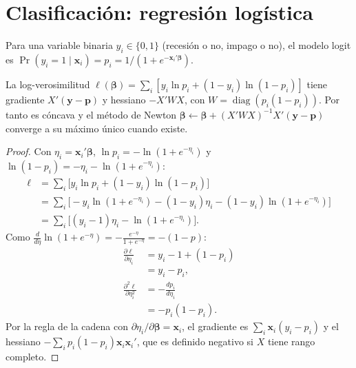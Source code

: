 \section{Clasificación: regresión logística}

Para una variable binaria $y_i\in\{0,1\}$ (recesión o no, impago o no), el modelo logit es
$\Pr(y_i=1\mid\mathbf x_i)=p_i=1/(1+e^{-\mathbf x_i'\boldsymbol\beta})$.

\begin{proposicion}\label{prop:logit}
La log-verosimilitud $\ell(\boldsymbol\beta)=\sum_i[y_i\ln p_i+(1-y_i)\ln(1-p_i)]$ tiene gradiente $X'(\mathbf y-\mathbf p)$ y hessiano
$-X'WX$, con $W=\operatorname{diag}(p_i(1-p_i))$. Por tanto es cóncava y el método de Newton
$\boldsymbol\beta\leftarrow\boldsymbol\beta+(X'WX)^{-1}X'(\mathbf y-\mathbf p)$ converge a su máximo único cuando existe.
\end{proposicion}

\begin{proof}
Con $\eta_i=\mathbf x_i'\boldsymbol\beta$, $\ln p_i=-\ln(1+e^{-\eta_i})$ y $\ln(1-p_i)=-\eta_i-\ln(1+e^{-\eta_i})$:
\begin{align*}
  \ell &= \sum_i\bigl[y_i\ln p_i+(1-y_i)\ln(1-p_i)\bigr]\\
       &= \sum_i\bigl[-y_i\ln(1+e^{-\eta_i})-(1-y_i)\eta_i-(1-y_i)\ln(1+e^{-\eta_i})\bigr]\\
       &= \sum_i\bigl[(y_i-1)\eta_i-\ln(1+e^{-\eta_i})\bigr].
\end{align*}
Como $\frac{d}{d\eta}\ln(1+e^{-\eta})=-\frac{e^{-\eta}}{1+e^{-\eta}}=-(1-p)$:
\begin{align*}
  \frac{\partial\ell}{\partial\eta_i} &= y_i-1+(1-p_i)\\
                                      &= y_i-p_i,\\
  \frac{\partial^2\ell}{\partial\eta_i^2} &= -\frac{dp_i}{d\eta_i}\\
                                          &= -p_i(1-p_i).
\end{align*}
Por la regla de la cadena con $\partial\eta_i/\partial\boldsymbol\beta=\mathbf x_i$, el gradiente es $\sum_i\mathbf x_i(y_i-p_i)$ y el hessiano
$-\sum_ip_i(1-p_i)\mathbf x_i\mathbf x_i'$, que es definido negativo si $X$ tiene rango completo.
\end{proof}

